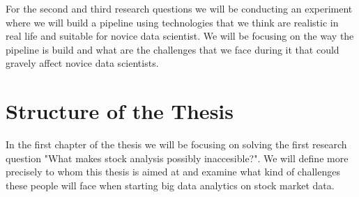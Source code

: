 For the second and third research questions we will be conducting an experiment where we will build a pipeline using technologies that we think are realistic in real life and suitable for novice data scientist.
We will be focusing on the way the pipeline is build and what are the challenges that we face during it that could gravely affect novice data scientists.





\section{Structure of the Thesis}

In the first chapter of the thesis we will be focusing on solving the first research question "What makes stock analysis possibly inaccesible?".
We will define more precisely to whom this thesis is aimed at and examine what kind of challenges these people will face when starting big data analytics on stock market data.

